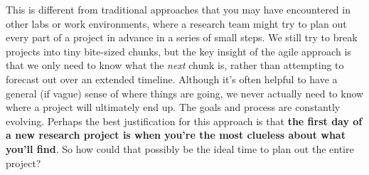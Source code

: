 \documentclass{tufte-book} %
\begin{document}
This is different from traditional approaches that you may have
encountered in other labs or work environments, where a research team
might try to plan out every part of a project in advance in a series
of small steps.  We still try to break projects into tiny bite-sized
chunks, but the key insight of the agile approach is that we only need
to know what the \textit{next} chunk is, rather than attempting to
forecast out over an extended timeline.  Although it's often helpful to
have a general (if vague) sense of where things are going, we never
actually need to know where a project will ultimately end up.  The
goals and process are constantly evolving.  Perhaps the best
justification for this approach is that \textbf{the first day of a new
  research project is when you're the most clueless about what you'll
  find}.  So how could that possibly be the ideal time to plan out the
entire project?
\end{document}
